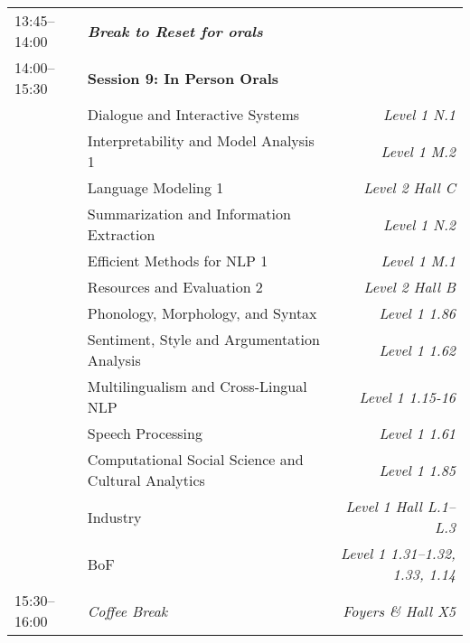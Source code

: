 \begin{xltabular}{\linewidth}{l X r}
    13:45--14:00    &   \textit{\textbf{Break to Reset for orals}}  & \\

    14:00--15:30    &   \textbf{Session 9: In Person Orals}   &   \\
    &   Dialogue and Interactive Systems   &   \textit{Level 1 N.1} \\
    &   Interpretability and Model Analysis 1  &   \textit{Level 1 M.2} \\
    &   Language Modeling 1  &   \textit{Level 2 Hall C} \\
    &   Summarization and Information Extraction  &   \textit{Level 1 N.2} \\
    &   Efficient Methods for NLP 1  &   \textit{Level 1 M.1} \\
    &   Resources and Evaluation 2  &   \textit{Level 2 Hall B} \\
    &   Phonology, Morphology, and Syntax  &   \textit{Level 1 1.86} \\
    &   Sentiment, Style and Argumentation Analysis  &   \textit{Level 1 1.62} \\
    &   Multilingualism and Cross-Lingual NLP  &   \textit{Level 1 1.15-16} \\
    &   Speech Processing   &   \textit{Level 1 1.61} \\
    &   Computational Social Science and Cultural Analytics  &   \textit{Level 1 1.85} \\
    &   Industry  & \textit{Level 1 Hall L.1--L.3} \\
    &   BoF &  \textit{Level 1 1.31--1.32, 1.33, 1.14} \\

    15:30--16:00    &   \textit{Coffee Break}    &  \textit{Foyers \& Hall X5} \\


\end{xltabular}
